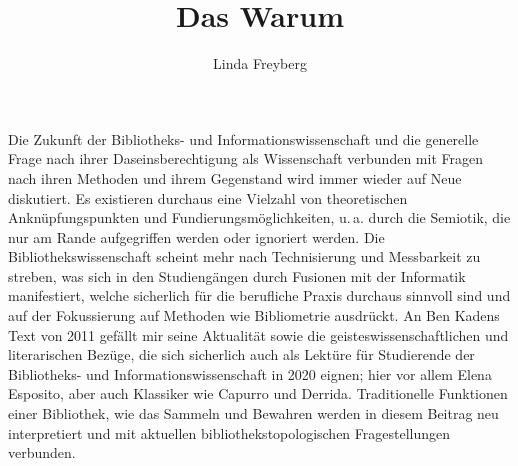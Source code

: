 \documentclass[output=paper]{langsci/langscibook}
\title{Das Warum}
\author{Linda Freyberg  \affiliation{Museum für Naturkunde}}
\begin{document}
\maketitle

\noindent Die Zukunft der Bibliotheks- und Informationswissenschaft und die generelle Frage nach ihrer Daseinsberechtigung als Wissenschaft verbunden mit Fragen nach ihren Methoden und ihrem Gegenstand wird immer wieder auf Neue diskutiert. Es existieren durchaus eine Vielzahl von theoretischen Anknüpfungspunkten und Fundierungsmöglichkeiten, u.\,a. durch die Semiotik, die nur am Rande aufgegriffen werden oder ignoriert werden. Die Bibliothekswissenschaft scheint mehr nach Technisierung und Messbarkeit zu streben, was sich in den Studiengängen durch Fusionen mit der Informatik manifestiert, welche sicherlich für die berufliche Praxis durchaus sinnvoll sind und auf der Fokussierung auf Methoden wie Bibliometrie ausdrückt. An Ben Kadens Text von 2011 gefällt mir seine Aktualität sowie die geisteswissenschaftlichen und literarischen Bezüge, die sich sicherlich auch als Lektüre für Studierende der Bibliotheks- und Informationswissenschaft in 2020 eignen; hier vor allem Elena Esposito, aber auch Klassiker wie Capurro und Derrida. Traditionelle Funktionen einer Bibliothek, wie das Sammeln und Bewahren werden in diesem Beitrag neu interpretiert und mit aktuellen bibliothekstopologischen Fragestellungen verbunden.
\end{document}
